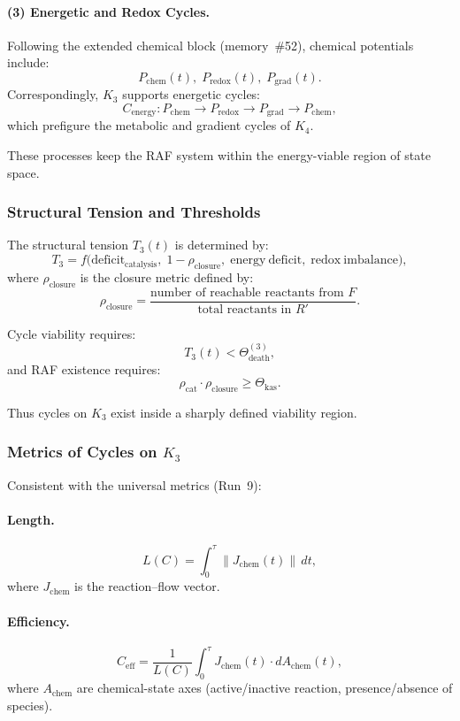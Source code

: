 \paragraph{(3) Energetic and Redox Cycles.}

Following the extended chemical block (memory~\#52),
chemical potentials include:
\[
  P_{\mathrm{chem}}(t),\;
  P_{\mathrm{redox}}(t),\;
  P_{\mathrm{grad}}(t).
\]
Correspondingly, $K_3$ supports energetic cycles:
\[
  C_{\mathrm{energy}}: 
  P_{\mathrm{chem}}\to P_{\mathrm{redox}}
    \to P_{\mathrm{grad}} \to P_{\mathrm{chem}},
\]
which prefigure the metabolic and gradient cycles of $K_4$.

These processes keep the RAF system within the energy-viable region
of state space.

\subsubsection{Structural Tension and Thresholds}

The structural tension $T_3(t)$ is determined by:
\[
  T_3 = 
   f\bigl(
     \mathrm{deficit}_{\mathrm{catalysis}},\;
     1-\rho_{\mathrm{closure}},\;
     \mathrm{energy\ deficit},\;
     \mathrm{redox\ imbalance}
   \bigr),
\]
where $\rho_{\mathrm{closure}}$ is the closure metric defined by:
\[
  \rho_{\mathrm{closure}} =
    \frac{\text{number of reachable reactants from } F}
         {\text{total reactants in } R'}.
\]

Cycle viability requires:
\[
  T_3(t) < \Theta_{\mathrm{death}}^{(3)},
\]
and RAF existence requires:
\[
  \rho_{\mathrm{cat}} \cdot \rho_{\mathrm{closure}}
  \ge \Theta_{\mathrm{kas}}.
\]

Thus cycles on $K_3$ exist inside a sharply defined viability region.

\subsubsection{Metrics of Cycles on \texorpdfstring{$K_3$}{K_3}}

Consistent with the universal metrics (Run~9):

\paragraph{Length.}
\[
  L(C) = \int_0^\tau \|J_{\mathrm{chem}}(t)\|\, dt,
\]
where $J_{\mathrm{chem}}$ is the reaction–flow vector.

\paragraph{Efficiency.}
\[
  C_{\mathrm{eff}}
   = \frac{1}{L(C)}
     \int_0^\tau J_{\mathrm{chem}}(t)\cdot dA_{\mathrm{chem}}(t),
\]
where $A_{\mathrm{chem}}$ are chemical-state axes (active/inactive
reaction, presence/absence of species).

